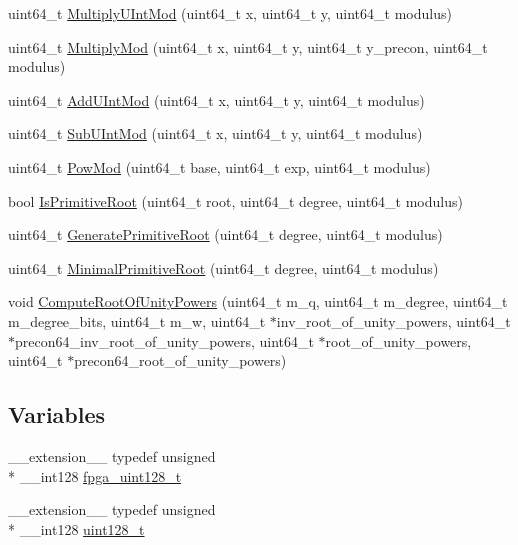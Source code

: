 \begin{DoxyCompactItemize}
\item 
uint64\-\_\-t \hyperlink{namespaceintel_1_1hexl_1_1fpga_a359488f73600f049c3bb43412ac677fa}{Multiply\-U\-Int\-Mod} (uint64\-\_\-t x, uint64\-\_\-t y, uint64\-\_\-t modulus)
\item 
uint64\-\_\-t \hyperlink{namespaceintel_1_1hexl_1_1fpga_a3864868e9a43df15ba64e89800214ae6}{Multiply\-Mod} (uint64\-\_\-t x, uint64\-\_\-t y, uint64\-\_\-t y\-\_\-precon, uint64\-\_\-t modulus)
\item 
uint64\-\_\-t \hyperlink{namespaceintel_1_1hexl_1_1fpga_a1144b661773bb78643f4785c6aa8b1da}{Add\-U\-Int\-Mod} (uint64\-\_\-t x, uint64\-\_\-t y, uint64\-\_\-t modulus)
\item 
uint64\-\_\-t \hyperlink{namespaceintel_1_1hexl_1_1fpga_af79ff4e8c2d42008053feebe7200d741}{Sub\-U\-Int\-Mod} (uint64\-\_\-t x, uint64\-\_\-t y, uint64\-\_\-t modulus)
\item 
uint64\-\_\-t \hyperlink{namespaceintel_1_1hexl_1_1fpga_a6c12d1ce00baa576a619d42e368a0bba}{Pow\-Mod} (uint64\-\_\-t base, uint64\-\_\-t exp, uint64\-\_\-t modulus)
\item 
bool \hyperlink{namespaceintel_1_1hexl_1_1fpga_a30c3a0934c1a35689405952f8d5c3a77}{Is\-Primitive\-Root} (uint64\-\_\-t root, uint64\-\_\-t degree, uint64\-\_\-t modulus)
\item 
uint64\-\_\-t \hyperlink{namespaceintel_1_1hexl_1_1fpga_a9628dca89b1827ee60f21c305705ac57}{Generate\-Primitive\-Root} (uint64\-\_\-t degree, uint64\-\_\-t modulus)
\item 
uint64\-\_\-t \hyperlink{namespaceintel_1_1hexl_1_1fpga_af1cd2e18fc07e6f6d58d9dbcc94aaf92}{Minimal\-Primitive\-Root} (uint64\-\_\-t degree, uint64\-\_\-t modulus)
\item 
void \hyperlink{namespaceintel_1_1hexl_1_1fpga_a4d25df05a50d6c613439b282ea5c2a0f}{Compute\-Root\-Of\-Unity\-Powers} (uint64\-\_\-t m\-\_\-q, uint64\-\_\-t m\-\_\-degree, uint64\-\_\-t m\-\_\-degree\-\_\-bits, uint64\-\_\-t m\-\_\-w, uint64\-\_\-t $\ast$inv\-\_\-root\-\_\-of\-\_\-unity\-\_\-powers, uint64\-\_\-t $\ast$precon64\-\_\-inv\-\_\-root\-\_\-of\-\_\-unity\-\_\-powers, uint64\-\_\-t $\ast$root\-\_\-of\-\_\-unity\-\_\-powers, uint64\-\_\-t $\ast$precon64\-\_\-root\-\_\-of\-\_\-unity\-\_\-powers)
\end{DoxyCompactItemize}
\subsection*{Variables}
\begin{DoxyCompactItemize}
\item 
\-\_\-\-\_\-extension\-\_\-\-\_\- typedef unsigned \\*
\-\_\-\-\_\-int128 \hyperlink{namespaceintel_1_1hexl_1_1fpga_abec5370ea5966ed3c9aee7817e805337}{fpga\-\_\-uint128\-\_\-t}
\item 
\-\_\-\-\_\-extension\-\_\-\-\_\- typedef unsigned \\*
\-\_\-\-\_\-int128 \hyperlink{namespaceintel_1_1hexl_1_1fpga_a855c40574416e25f94fb6b7817c2c4f3}{uint128\-\_\-t}
\end{DoxyCompactItemize}


